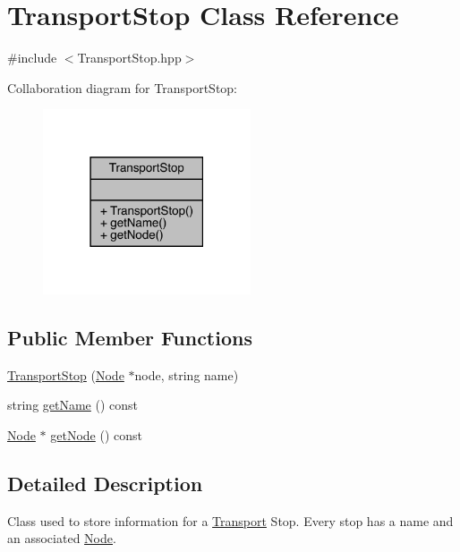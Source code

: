 \hypertarget{class_transport_stop}{}\section{Transport\+Stop Class Reference}
\label{class_transport_stop}


{\ttfamily \#include $<$Transport\+Stop.\+hpp$>$}



Collaboration diagram for Transport\+Stop\+:\nopagebreak
\begin{figure}[H]
\begin{center}
\leavevmode
\includegraphics[width=174pt]{class_transport_stop__coll__graph}
\end{center}
\end{figure}
\subsection*{Public Member Functions}
\begin{DoxyCompactItemize}
\item 
\hyperlink{class_transport_stop_ab41c7393ddb45b59cc172724eff2ff77}{Transport\+Stop} (\hyperlink{class_node}{Node} $\ast$node, string name)
\item 
string \hyperlink{class_transport_stop_ac4e1999cbad5b9d6e25c9abee0649064}{get\+Name} () const
\item 
\hyperlink{class_node}{Node} $\ast$ \hyperlink{class_transport_stop_ab38b14d8cfac1949ac8f853fdf8620bc}{get\+Node} () const
\end{DoxyCompactItemize}


\subsection{Detailed Description}
Class used to store information for a \hyperlink{class_transport}{Transport} Stop. Every stop has a name and an associated \hyperlink{class_node}{Node}. 

